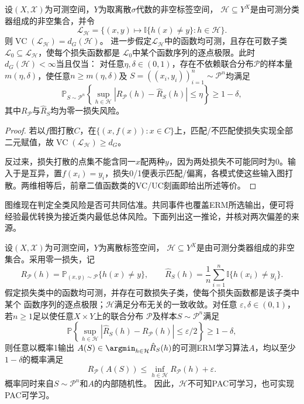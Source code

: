 \begin{theorem}[图维与一致收敛]
\label{thm:graph-uniform-convergence}
设$(X,\mathcal X)$为可测空间，$Y$为取离散$\sigma$代数的非空标签空间，
$\mathcal H\subseteq Y^X$是由可测分类器组成的非空集合，并令
\[
 \mathcal L_{\mathcal H}
 =\{(x,y)\mapsto\mathbb I\{h(x)\neq y\}:h\in\mathcal H\}.
\]
则$\operatorname{VC}(\mathcal L_{\mathcal H})=d_G(\mathcal H)$。
进一步假定$\mathcal L_{\mathcal H}$中的函数均可测，且存在可数子类
$\mathcal L_0\subseteq\mathcal L_{\mathcal H}$，使每个损失函数都是
$\mathcal L_0$中某个函数序列的逐点极限。此时$d_G(\mathcal H)<\infty$当且仅当：
对任意$\eta,\delta\in(0,1)$，存在不依赖联合分布$\mathcal P$的样本量
$m(\eta,\delta)$，使任意$n\geq m(\eta,\delta)$及
$S=((x_i,y_i))_{i=1}^n\sim\mathcal P^n$均满足
\[
 \mathbb P_{S\sim\mathcal P^n}\left\{
 \sup_{h\in\mathcal H}|R_{\mathcal P}(h)-\hat R_S(h)|\leq\eta
 \right\}\geq1-\delta,
\]
其中$R_{\mathcal P}$与$\hat R_S$均为零一损失风险。
\end{theorem}

\begin{proof}
若以$f$图打散$C$，在$\{(x,f(x)):x\in C\}$上，匹配/不匹配使损失实现全部二元赋值，故$\operatorname{VC}(\mathcal L_{\mathcal H})\geq d_G$。

反过来，损失打散的点集不能含同一$x$配两种$y$，因为两处损失不可能同时为0。输入于是互异，置$f(x_i)=y_i$，损失0/1便表示匹配/偏离，各模式使这些输入图打散。两维相等后，前章二值函数类的VC/UC刻画即给出所述等价。
\end{proof}

图维现在判定全类风险是否可共同估准。共同事件也覆盖ERM所选输出，便可将经验最优转换为接近类内最低总体风险。下面列出这一推论，并核对两次偏差的来源。

\begin{theorem}[一致收敛推出可学习性]
\label{thm:multiclass-uniform-pac}
设$(X,\mathcal X)$为可测空间，$Y$为离散标签空间，
$\mathcal H\subseteq Y^X$是由可测分类器组成的非空集合。采用零一损失，记
\[
 R_{\mathcal P}(h)=\mathbb P_{(x,y)\sim\mathcal P}\{h(x)\neq y\},\qquad
 \hat R_S(h)=\frac1n\sum_{i=1}^n\mathbb I\{h(x_i)\neq y_i\}.
\]
假定损失类中的函数均可测，并存在可数损失子类，使每个损失函数都是该子类中某个
函数序列的逐点极限；$\mathcal H$满足分布无关的一致收敛。对任意
$\varepsilon,\delta\in(0,1)$，若$n\geq1$足以使任意$X\times Y$上的联合分布
$\mathcal P$及样本$S\sim\mathcal P^n$满足
\[
 \mathbb P\!\left\{
 \sup_{h\in\mathcal H}|\hat R_S(h)-R_{\mathcal P}(h)|\leq\varepsilon/2
 \right\}\geq1-\delta,
\]
则任意以概率1输出
$A(S)\in\argmin_{h\in\mathcal H}\hat R_S(h)$的可测ERM学习算法$A$，均以至少
$1-\delta$的概率满足
\[
 R_{\mathcal P}(A(S))\leq\inf_{h\in\mathcal H}R_{\mathcal P}(h)+\varepsilon.
\]
概率同时来自$S\sim\mathcal P^n$和$A$的内部随机性。
因此，$\mathcal H$不可知PAC可学习，也可实现PAC可学习。
\end{theorem}


